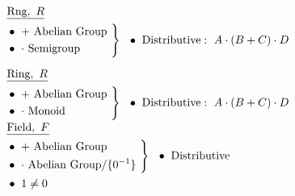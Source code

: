 \documentclass{article}
\begin{document}
\vspace{15pt}
\(\begin{aligned}[t]
    & \underline{\text{Rng},\ R}\\
    & \hspace{-3pt} \left. \begin{aligned}
            & \bullet\ +\ \text{Abelian Group}\\
            & \bullet\ \cdot\ \text{Semigroup}\\    
        \end{aligned}
        \ \right\}
        \ \ \bullet\ \text{Distributive}:\ A \cdot (B + C) \cdot D
        \\[5pt]
    & \underline{\text{Ring},\ R}\\
    & \hspace{-3pt} \left. \begin{aligned}
            & \bullet\ +\ \text{Abelian Group}\\
            & \bullet\ \cdot\ \text{Monoid}\\    
        \end{aligned}
        \ \right\}
        \ \ \bullet\ \text{Distributive}:\ A \cdot (B + C) \cdot D
        \\
\end{aligned}\)
\hspace{15pt}
\(\begin{aligned}[t]
    & \underline{\text{Field},\ F}\\
    & \hspace{-3pt} \left. \begin{aligned}
            & \bullet\ +\ \text{Abelian Group}\\
            & \bullet\ \cdot\ \text{Abelian Group}/\{0^{-1}\}\\
        \end{aligned}
        \ \right\}
        \ \ \bullet\ \text{Distributive}
        \\
    & \bullet\ 1 \neq 0
\end{aligned}\)
\end{document}
